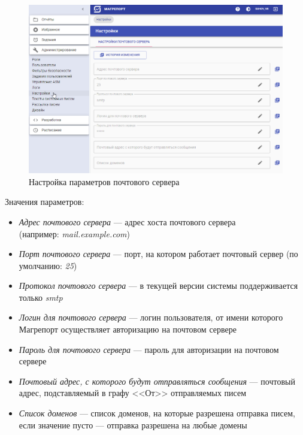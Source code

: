 \documentclass[../user-manual.tex]{subfiles}
\begin{document}
	\begin{figure}[h]
		\centering
		\includegraphics[width=\graphicswidth]{img/01-email-settings.png}
		\caption{Настройка параметров почтового сервера}
		\label{fig:email-settings}
	\end{figure}

	Значения параметров:
	
	\begin{itemize}
		\item \textit{Адрес почтового сервера} --- адрес хоста почтового сервера \\ (например: \textit{mail.example.com})
		
		\item \textit{Порт почтового сервера} --- порт, на котором работает почтовый сервер (по умолчанию: \textit{25})
		
		\item \textit{Протокол почтового сервера} --- в текущей версии системы поддерживается только \textit{smtp}
		
		\item \textit{Логин для почтового сервера} --- логин пользователя, от имени которого Магрепорт осуществляет авторизацию на почтовом сервере
		
		\item \textit{Пароль для почтового сервера} --- пароль для авторизации на почтовом сервере
		
		\item \textit{Почтовый адрес, с которого будут отправляться сообщения} --- почтовый адрес, подставляемый в графу <<От>> отправляемых писем
		
		\item \textit{Список доменов} --- список доменов, на которые разрешена отправка писем, если значение пусто --- отправка разрешена на любые домены
		
	\end{itemize}
	
\end{document}
